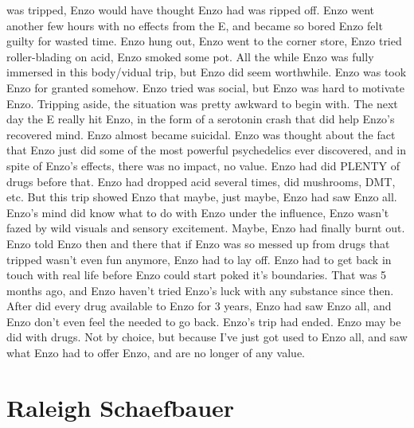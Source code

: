 \documentclass[12pt]{book}
\begin{document}
was tripped, Enzo would have thought Enzo had was ripped off. Enzo went another few hours with no effects from the E, and became so bored Enzo felt guilty for wasted time. Enzo hung out, Enzo went to the corner store, Enzo tried roller-blading on acid, Enzo smoked some pot. All the while Enzo was fully immersed in this body/vidual trip, but Enzo did seem worthwhile. Enzo was took Enzo for granted somehow. Enzo tried was social, but Enzo was hard to motivate Enzo. Tripping aside, the situation was pretty awkward to begin with. The next day the E really hit Enzo, in the form of a serotonin crash that did help Enzo's recovered mind. Enzo almost became suicidal. Enzo was thought about the fact that Enzo just did some of the most powerful psychedelics ever discovered, and in spite of Enzo's effects, there was no impact, no value. Enzo had did PLENTY of drugs before that. Enzo had dropped acid several times, did mushrooms, DMT, etc. But this trip showed Enzo that maybe, just maybe, Enzo had saw Enzo all. Enzo's mind did know what to do with Enzo under the influence, Enzo wasn't fazed by wild visuals and sensory excitement. Maybe, Enzo had finally burnt out. Enzo told Enzo then and there that if Enzo was so messed up from drugs that tripped wasn't even fun anymore, Enzo had to lay off. Enzo had to get back in touch with real life before Enzo could start poked it's boundaries. That was 5 months ago, and Enzo haven't tried Enzo's luck with any substance since then. After did every drug available to Enzo for 3 years, Enzo had saw Enzo all, and Enzo don't even feel the needed to go back. Enzo's trip had ended. Enzo may be did with drugs. Not by choice, but because I've just got used to Enzo all, and saw what Enzo had to offer Enzo, and are no longer of any value.



\chapter{Raleigh Schaefbauer}
\end{document}
